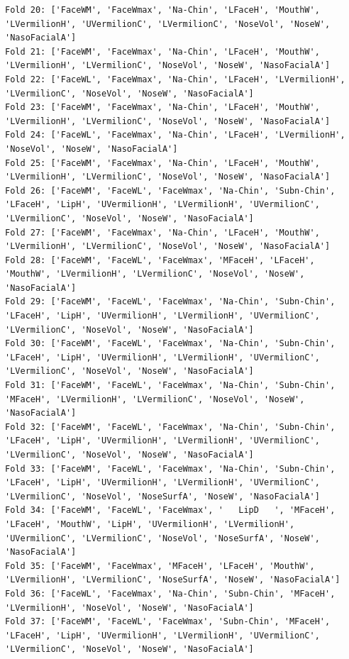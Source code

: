 \documentclass[12pt,a4paper]{article}
\begin{document}
\begin{verbatim}
Fold 20: ['FaceWM', 'FaceWmax', 'Na-Chin', 'LFaceH', 'MouthW', 'LVermilionH', 'UVermilionC', 'LVermilionC', 'NoseVol', 'NoseW', 'NasoFacialA']
Fold 21: ['FaceWM', 'FaceWmax', 'Na-Chin', 'LFaceH', 'MouthW', 'LVermilionH', 'LVermilionC', 'NoseVol', 'NoseW', 'NasoFacialA']
Fold 22: ['FaceWL', 'FaceWmax', 'Na-Chin', 'LFaceH', 'LVermilionH', 'LVermilionC', 'NoseVol', 'NoseW', 'NasoFacialA']
Fold 23: ['FaceWM', 'FaceWmax', 'Na-Chin', 'LFaceH', 'MouthW', 'LVermilionH', 'LVermilionC', 'NoseVol', 'NoseW', 'NasoFacialA']
Fold 24: ['FaceWL', 'FaceWmax', 'Na-Chin', 'LFaceH', 'LVermilionH', 'NoseVol', 'NoseW', 'NasoFacialA']
Fold 25: ['FaceWM', 'FaceWmax', 'Na-Chin', 'LFaceH', 'MouthW', 'LVermilionH', 'LVermilionC', 'NoseVol', 'NoseW', 'NasoFacialA']
Fold 26: ['FaceWM', 'FaceWL', 'FaceWmax', 'Na-Chin', 'Subn-Chin', 'LFaceH', 'LipH', 'UVermilionH', 'LVermilionH', 'UVermilionC', 'LVermilionC', 'NoseVol', 'NoseW', 'NasoFacialA']
Fold 27: ['FaceWM', 'FaceWmax', 'Na-Chin', 'LFaceH', 'MouthW', 'LVermilionH', 'LVermilionC', 'NoseVol', 'NoseW', 'NasoFacialA']
Fold 28: ['FaceWM', 'FaceWL', 'FaceWmax', 'MFaceH', 'LFaceH', 'MouthW', 'LVermilionH', 'LVermilionC', 'NoseVol', 'NoseW', 'NasoFacialA']
Fold 29: ['FaceWM', 'FaceWL', 'FaceWmax', 'Na-Chin', 'Subn-Chin', 'LFaceH', 'LipH', 'UVermilionH', 'LVermilionH', 'UVermilionC', 'LVermilionC', 'NoseVol', 'NoseW', 'NasoFacialA']
Fold 30: ['FaceWM', 'FaceWL', 'FaceWmax', 'Na-Chin', 'Subn-Chin', 'LFaceH', 'LipH', 'UVermilionH', 'LVermilionH', 'UVermilionC', 'LVermilionC', 'NoseVol', 'NoseW', 'NasoFacialA']
Fold 31: ['FaceWM', 'FaceWL', 'FaceWmax', 'Na-Chin', 'Subn-Chin', 'MFaceH', 'LVermilionH', 'LVermilionC', 'NoseVol', 'NoseW', 'NasoFacialA']
Fold 32: ['FaceWM', 'FaceWL', 'FaceWmax', 'Na-Chin', 'Subn-Chin', 'LFaceH', 'LipH', 'UVermilionH', 'LVermilionH', 'UVermilionC', 'LVermilionC', 'NoseVol', 'NoseW', 'NasoFacialA']
Fold 33: ['FaceWM', 'FaceWL', 'FaceWmax', 'Na-Chin', 'Subn-Chin', 'LFaceH', 'LipH', 'UVermilionH', 'LVermilionH', 'UVermilionC', 'LVermilionC', 'NoseVol', 'NoseSurfA', 'NoseW', 'NasoFacialA']
Fold 34: ['FaceWM', 'FaceWL', 'FaceWmax', '   LipD   ', 'MFaceH', 'LFaceH', 'MouthW', 'LipH', 'UVermilionH', 'LVermilionH', 'UVermilionC', 'LVermilionC', 'NoseVol', 'NoseSurfA', 'NoseW', 'NasoFacialA']
Fold 35: ['FaceWM', 'FaceWmax', 'MFaceH', 'LFaceH', 'MouthW', 'LVermilionH', 'LVermilionC', 'NoseSurfA', 'NoseW', 'NasoFacialA']
Fold 36: ['FaceWL', 'FaceWmax', 'Na-Chin', 'Subn-Chin', 'MFaceH', 'LVermilionH', 'NoseVol', 'NoseW', 'NasoFacialA']
Fold 37: ['FaceWM', 'FaceWL', 'FaceWmax', 'Subn-Chin', 'MFaceH', 'LFaceH', 'LipH', 'UVermilionH', 'LVermilionH', 'UVermilionC', 'LVermilionC', 'NoseVol', 'NoseW', 'NasoFacialA']

\end{verbatim}
\end{document}
